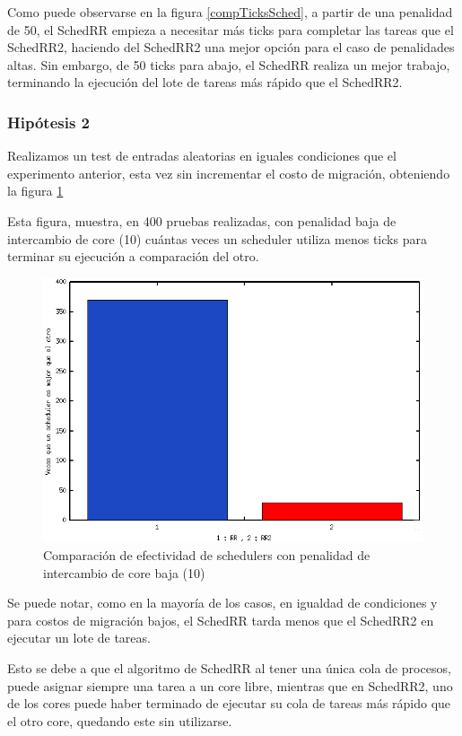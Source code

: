\documentclass[a4paper,10pt,twoside]{article}
\begin{document}
Como puede observarse en la figura \ref{compTicksSched}, a partir de una penalidad de 50, el SchedRR empieza a necesitar más ticks para completar las tareas que el SchedRR2, haciendo del SchedRR2 una mejor opción para el caso de penalidades altas. Sin embargo, de 50 ticks para abajo, el SchedRR realiza un mejor trabajo, terminando la ejecución del lote de tareas más rápido que el SchedRR2.

\subsubsection{Hipótesis 2}

Realizamos un test de entradas aleatorias en iguales condiciones que el experimento anterior, esta vez sin incrementar el costo de migración, obteniendo la figura \ref{RRvsRR2}

Esta figura, muestra, en 400 pruebas realizadas, con penalidad baja de intercambio de core (10) cuántas veces un scheduler utiliza menos ticks para terminar su ejecución a comparación del otro.

\begin{figure}[H]
\centering
\includegraphics[width=150mm]{../ejercicio8/RRvsRR2.png}
\caption{Comparación de efectividad de schedulers con penalidad de intercambio de core baja (10)}
\label{RRvsRR2}
\end{figure}

Se puede notar, como en la mayoría de los casos, en igualdad de condiciones y para costos de migración bajos, el SchedRR tarda menos que el SchedRR2 en ejecutar un lote de tareas.

Esto se debe a que el algoritmo de SchedRR al tener una única cola de procesos, puede asignar siempre una tarea a un core libre, mientras que en SchedRR2, uno de los cores puede haber terminado de ejecutar su cola de tareas más rápido que el otro core, quedando este sin utilizarse.
\end{document}
